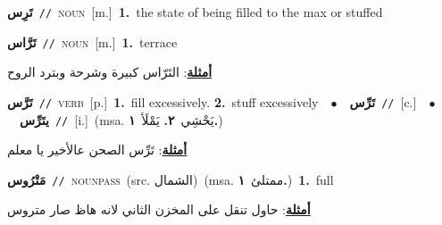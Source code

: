 \documentclass[10pt,a4paper,twoside]{article} %
\begin{document}
\begin{multicols}{2}
{\setlength\topsep{0pt}\textbf{\foreignlanguage{arabic}{تَرِس}}\ {\color{gray}\texttt{//}\color{black}}\ \textsc{noun}\ [m.]\ \textbf{1.}~the state of being filled to the max or stuffed\ } \vspace{2mm}

{\setlength\topsep{0pt}\textbf{\foreignlanguage{arabic}{تَرَّاس}}\ {\color{gray}\texttt{//}\color{black}}\ \textsc{noun}\ [m.]\ \textbf{1.}~terrace\  \begin{flushright}\color{gray}\foreignlanguage{arabic}{\textbf{\underline{\foreignlanguage{arabic}{أمثلة}}}: التَرّاس كبيرة وشرحة وبترد الروح}\end{flushright}\color{black}} \vspace{2mm}

{\setlength\topsep{0pt}\textbf{\foreignlanguage{arabic}{تَرَّس}}\ {\color{gray}\texttt{//}\color{black}}\ \textsc{verb}\ [p.]\ \textbf{1.}~fill excessively.  \textbf{2.}~stuff excessively\ \ $\bullet$\ \ \setlength\topsep{0pt}\textbf{\foreignlanguage{arabic}{تَرِّس}}\ {\color{gray}\texttt{//}\color{black}}\ [c.]\ \ $\bullet$\ \ \setlength\topsep{0pt}\textbf{\foreignlanguage{arabic}{يتَرِّس}}\ {\color{gray}\texttt{//}\color{black}}\ [i.]\ \color{gray}(msa. \foreignlanguage{arabic}{يَحْشِي}~\foreignlanguage{arabic}{\textbf{٢.}}  \foreignlanguage{arabic}{يَمْلَأ}~\foreignlanguage{arabic}{\textbf{١.}})\color{black}\  \begin{flushright}\color{gray}\foreignlanguage{arabic}{\textbf{\underline{\foreignlanguage{arabic}{أمثلة}}}: تَرِّس الصحن عالأخير يا معلم}\end{flushright}\color{black}} \vspace{2mm}

{\setlength\topsep{0pt}\textbf{\foreignlanguage{arabic}{مَتْرُوس}}\ {\color{gray}\texttt{//}\color{black}}\ \textsc{noun\textunderscore pass}\ (src. \color{gray}\foreignlanguage{arabic}{الشمال}\color{black})\ \color{gray}(msa. \foreignlanguage{arabic}{ممتلئ}~\foreignlanguage{arabic}{\textbf{١.}})\color{black}\ \textbf{1.}~full\  \begin{flushright}\color{gray}\foreignlanguage{arabic}{\textbf{\underline{\foreignlanguage{arabic}{أمثلة}}}: حاول تنقل على المخزن الثاني لانه هاظ صار متروس}\end{flushright}\color{black}} \vspace{2mm}


\end{multicols}
\end{document}
